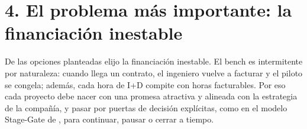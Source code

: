 \documentclass[11pt,letterpaper]{article}
\begin{document}
\section*{4. El problema más importante: la financiación inestable}

De las opciones planteadas elijo la financiación inestable. El bench es
intermitente por naturaleza: cuando llega un contrato, el ingeniero vuelve a
facturar y el piloto se congela; además, cada hora de I+D compite con horas
facturables. Por eso cada proyecto debe nacer con una promesa atractiva y
alineada con la estrategia de la compañía, y pasar por puertas de decisión
explícitas, como en el modelo Stage-Gate de \textcite{cooper1990}, para
continuar, pausar o cerrar a tiempo.

\printbibliography[title={Referencias}]
\end{document}
